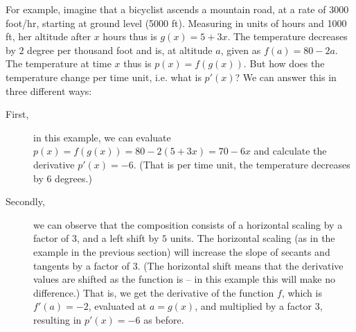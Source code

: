 For example, imagine that a bicyclist ascends a mountain road,
at a rate of $3000$
foot/hr, starting at ground level (5000 ft). Measuring in units of hours and
1000 ft, her altitude after $x$ hours thus is $g(x)=5+3x$.
The temperature decreases by $2$ degree per thousand foot and is, at
altitude $a$, given as $f(a)=80-2a$. The temperature at time $x$ thus is
$p(x)=f(g(x))$. But how does the temperature change per time unit, i.e. what
is $p'(x)$? We can answer this in three different ways:

\begin{description}
\item[First,] in this example, we can evaluate $p(x)=f(g(x))=80-2(5+3x)=70-6x$ and
calculate the derivative $p'(x)=-6$. (That is per time unit, the temperature
decreases by 6 degrees.)

\item[Secondly,] we can observe that the composition consists of a horizontal
scaling by a factor of 3, and a left shift by $5$ units. The horizontal
scaling (as in the example in the previous section) will increase the slope
of secants and tangents by a factor of $3$. (The horizontal shift means that
the derivative values are shifted as the function is -- in this example this
will make no difference.) That is, we get the derivative of the function
$f$, which is $f'(a)=-2$, evaluated at $a=g(x)$, and multiplied by a factor
$3$, resulting in $p'(x)=-6$ as before.


\end{description}
